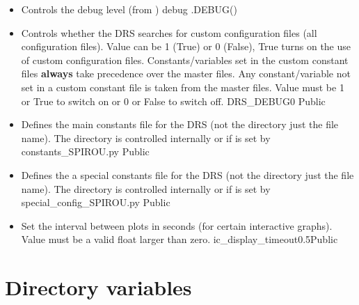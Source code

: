 \begin{itemize}
\ifdevguide
\item {}
{Controls the debug level (from )}
{debug}
{\AllRecipes}{\spirouConst.DEBUG()}{\AllRecipes}
\fi


\item {} 
{Controls whether the DRS searches for custom configuration files (all configuration files). Value can be 1 (True) or 0 (False), True turns on the use of custom configuration files. Constants/variables set in the custom constant files \textbf{always} take precedence over the master files. Any constant/variable not set in a custom constant file is taken from the master files. Value must be 1 or True to switch on or 0 or False to switch off.}
{DRS\_DEBUG}{0}
{\AllRecipes}{\configtxtfile}{\AllRecipes}{Public}

\item {} 
{Defines the main constants file for the DRS (not the directory just the file name). The directory is controlled internally or if  is set by }{constants\_SPIROU.py}
{\AllRecipes}{\configtxtfile}{\AllRecipes}{Public}


\item {}
{Defines the a special constants file for the DRS (not the directory just the file name). The directory is controlled internally or if  is set by }{special\_config\_SPIROU.py}
{\AllRecipes}{\configtxtfile}{\AllRecipes}{Public}

\item {}
{Set the interval between plots in seconds (for certain interactive graphs). Value must be a valid float larger than zero.}
{ic\_display\_timeout}{0.5}{\callocRAW}{\constantsfile}{}{Public}

\end{itemize}






\section{Directory variables}
\label{ch:variables:directory}

